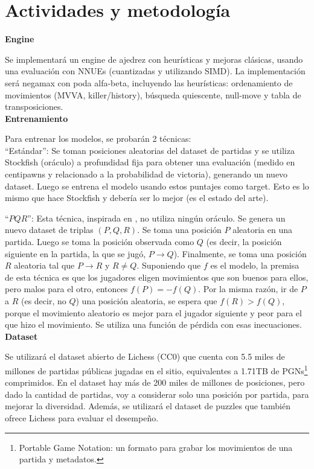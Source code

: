 \newpage
\section*{Actividades y metodología}

\textbf{Engine}

Se implementará un engine de ajedrez con heurísticas y mejoras clásicas, usando una evaluación con NNUEs (cuantizadas y utilizando SIMD). La implementación será negamax con poda alfa-beta, incluyendo las heurísticas: ordenamiento de movimientos (MVVA, killer/history), búsqueda quiescente, null-move y tabla de transposiciones. \\

\textbf{Entrenamiento}

Para entrenar los modelos, se probarán 2 técnicas: \\

``Estándar'': Se toman posiciones aleatorias del dataset de partidas y se utiliza Stockfish (oráculo) a profundidad fija para obtener una evaluación (medido en centipawns y relacionado a la probabilidad de victoria), generando un nuevo dataset. Luego se entrena el modelo usando estos puntajes como target. Esto es lo mismo que hace Stockfish y debería ser lo mejor (es el estado del arte).

``$PQR$'': Esta técnica, inspirada en \cite{dlchess:2014}, no utiliza ningún oráculo. Se genera un nuevo dataset de triplas $(P,Q,R)$. Se toma una posición $P$ aleatoria en una partida. Luego se toma la posición observada como $Q$ (es decir, la posición siguiente en la partida, la que se jugó, $P \rightarrow Q$). Finalmente, se toma una posición $R$ aleatoria tal que $P \rightarrow R$ y $R \neq Q$. Suponiendo que $f$ es el modelo, la premisa de esta técnica es que los jugadores eligen movimientos que son buenos para ellos, pero malos para el otro, entonces $f(P)=-f(Q)$. Por la misma razón, ir de $P$ a $R$ (es decir, no $Q$) una posición aleatoria, se espera que $f(R) > f(Q)$, porque el movimiento aleatorio es mejor para el jugador siguiente y peor para el que hizo el movimiento. Se utiliza una función de pérdida con esas inecuaciones. \\


\textbf{Dataset}

Se utilizará el dataset abierto de Lichess \cite{lichessdb} (CC0) que cuenta con 5.5 miles de millones de partidas públicas jugadas en el sitio, equivalentes a 1.71TB de PGNs\footnote[1]{Portable Game Notation: un formato para grabar los movimientos de una partida y metadatos.} comprimidos. En el dataset hay más de 200 miles de millones de posiciones, pero dado la cantidad de partidas, voy a considerar solo una posición por partida, para mejorar la diversidad. Además, se utilizará el dataset de puzzles que también ofrece Lichess para evaluar el desempeño.

